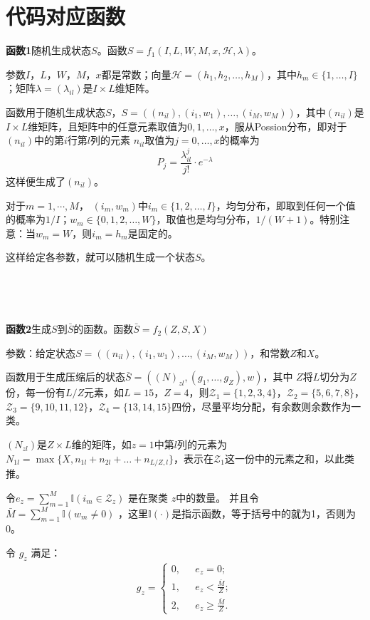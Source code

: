 \documentclass[a4paper,11pt]
{elsarticle}%
\begin{document}
\section{代码对应函数}


\textbf{函数1}随机生成状态$S$。函数$S=f_1(I,L,W,M,x,\mathscr{H},\lambda)$。

参数$I$，$L$，$W$，$M$，$x$都是常数；向量$\mathscr{H}=(h_1,h_2,\ldots,h_M)$，其中$h_m\in\{1,\ldots,I\}$；矩阵$\lambda=(\lambda_{il})$是$I\times L$维矩阵。

函数用于随机生成状态$S$，$S=((n_{il}),(i_1,w_1),\ldots,(i_M,w_M))$，其中$(n_{il})$是$I\times L$维矩阵，且矩阵中的任意元素取值为$0,1,\ldots,x$，服从Possion分布，即对于$(n_{il})$中的第$i$行第$l$列的元素
$n_{il}$取值为$j=0,\ldots,x$的概率为
$$
P_j=\frac{\lambda_{il}^j}{j!}\cdot e^{-\lambda}
$$
这样便生成了$(n_{il})$。

对于$m=1,\cdots,M$，
$(i_m,w_m)$中$i_m\in\{1,2,\ldots,I\}$，均匀分布，即取到任何一个值的概率为$1/I$；$w_m\in\{0,1,2,\ldots,W\}$，取值也是均匀分布，$1/(W+1)$。特别注意：当$w_m=W$，则$i_m=h_m$是固定的。


这样给定各参数，就可以随机生成一个状态$S$。


~

~

\textbf{函数2}生成$S$到$\bar{S}$的函数。函数$\bar{S}=f_2(Z,S,X)$

参数：给定状态$S=((n_{il}),(i_1,w_1),\ldots,(i_M,w_M))$，和常数$Z$和$X$。

函数用于生成压缩后的状态$\bar{S}=((N)_{zl},(g_1,\ldots,g_Z),w)$，其中
$Z$将$L$切分为$Z$份，每一份有$L/Z$元素，如$L=15$，$Z=4$，则$\mathscr{Z}_1=\{1,2,3,4\}$，$\mathscr{Z}_2=\{5,6,7,8\}$，$\mathscr{Z}_3=\{9,10,11,12\}$，$\mathscr{Z}_4=\{13,14,15\}$四份，尽量平均分配，有余数则余数作为一类。

$(N_{zl})$是$Z\times L$维的矩阵，如$z=1$中第$l$列的元素为$N_{1l}=\max\{X,n_{1l}+n_{2l}+\ldots+n_{L/Z,l}\}$，表示在$\mathscr{Z}_1$这一份中的元素之和，以此类推。

令$e_z=\sum_{m=1}^M \mathbb{I}(i_m\in\mathscr{Z}_z)$ 是在聚类 $z$中的数量。 并且令 $\bar{M}=\sum_{m=1}^M \mathbb{I}(w_m\not=0)$ ，这里$\mathbb{I}(\cdot)$是指示函数，等于括号中的就为1，否则为0。

令 $g_z$ 满足：
\begin{align}\label{eq-g}
g_z=\left\{
\begin{array}{ll}
0,~~~&e_z=0;      \\1,~~~&e_z<\frac{\bar{M}}{Z};
\\
2,~~~&e_z\geq\frac{\bar{M}}{Z}.
\end{array}\right.
\end{align} 
\end{document}
